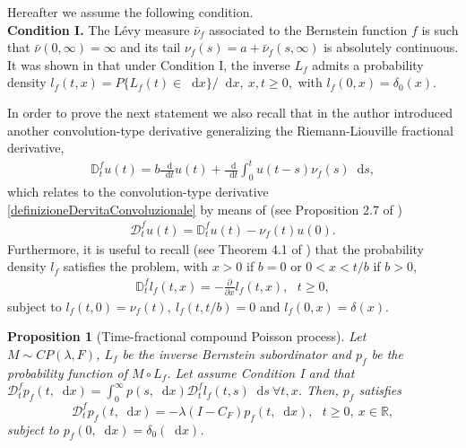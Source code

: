 \documentclass[12pt, twoside, english, headsepline]{article}
\newcommand*\dif{\mathop{}\!\mathrm{d}}  %
\newtheorem{proposition}{Proposition}[section] %
\theoremstyle{definition} %
\numberwithin{equation}{section} %
\begin{document}
Hereafter we assume the following condition.
\\
\textbf{Condition I.} The L\'{e}vy measure $\bar\nu_f$ associated to the Bernstein function $f$ is such that $\bar\nu(0,\infty) = \infty$ and its tail $\nu_f(s) = a+\bar \nu_f(s,\infty)$ is absolutely continuous.
\\

It was shown in \cite{T2015} that under Condition I, the inverse $L_f$ admits a probability density $l_f(t,x) = P\{L_f(t)\in\dif x\}/\dif x, \ x,t \ge0,$ with $l_f(0,x) = \delta_0(x)$.

In order to prove the next statement we also recall that in \cite{T2015} the author introduced another convolution-type derivative generalizing the Riemann-Liouville fractional derivative, 
\begin{align}
	\mathbb{D}_t^f u(t) =  b\frac{\dif }{\dif t}u(t) + \frac{\dif }{\dif t}\int_0^t u(t-s)\nu_f(s)\dif s,
\end{align}
which relates to the convolution-type derivative \eqref{definizioneDervitaConvoluzionale} by means of (see Proposition 2.7 of \cite{T2015})
\begin{align}\label{relazioneOperatoriConvoluzione}
	\mathcal{D}_t^f u(t) =\mathbb{D}_t^f u(t) - \nu_f(t) u(0).
\end{align}
Furthermore, it is useful to recall (see Theorem 4.1 of \cite{T2015}) that the probability density $l_f$ satisfies the problem, with  $x>0$ if $b = 0$ or $0<x<t/b$ if $b>0$,
\begin{align}\label{legameDerivataConvoluzionaleLiouvilleOperatoreSpaziale}
	\mathbb{D}_t^f l_f(t,x)= -\frac{\partial }{\partial x}l_f(t,x), \ \ \ t\ge0,
\end{align}
subject to $l_f(t,0) = \nu_f(t), \ l_f(t, t/b)=0$ and $l_f(0,x) = \delta(x)$.

\begin{proposition}[Time-fractional compound Poisson process]\label{proposizioneComposizioneInversoSubordinatore}
	Let $M\sim CP(\lambda, F)$, $L_f$ be the inverse Bernstein subordinator and  $p_f$ be the probability function of $M\circ L_f$. Let assume Condition I and that $\mathcal{D}_t^f p_f(t,\dif x) = \int_0^\infty p(s,\dif x) \mathcal{D}_t^f l_f(t,s)\dif s\ \forall t,x$. Then, $p_f$ satisfies
	\begin{equation}
		\mathcal{D}_t^f p_f(t,\dif x) = -\lambda(I-C_F) p_f(t,\dif x),\ \ \ t\ge0,\ x\in \mathbb{R},
	\end{equation}
	subject to $p_f(0,\dif x) = \delta_0(\dif x)$.
\end{proposition}
\end{document}

